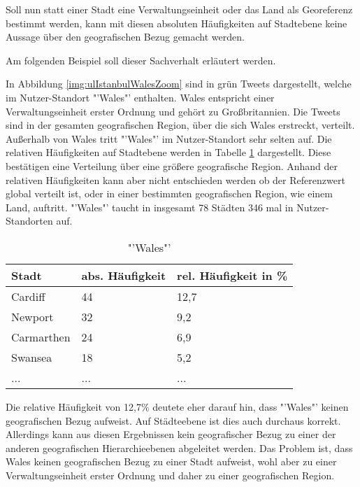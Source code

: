 			Soll nun statt einer Stadt eine Verwaltungseinheit oder das Land als Georeferenz bestimmt werden, kann mit diesen absoluten Häufigkeiten auf Stadtebene keine Aussage über den geografischen Bezug gemacht werden. 
			
			Am folgenden Beispiel soll dieser Sachverhalt erläutert werden.

			In Abbildung \ref{img:ulIstanbulWalesZoom} sind in grün Tweets dargestellt, welche im Nutzer-Standort "'Wales"' enthalten.
			Wales entspricht einer Verwaltungseinheit erster Ordnung und gehört zu Großbritannien.
			Die Tweets sind in der gesamten geografischen Region, über die sich Wales erstreckt, verteilt.
			Außerhalb von Wales tritt "'Wales"' im Nutzer-Standort sehr selten auf.
			Die relativen Häufigkeiten auf Stadtebene werden in Tabelle \ref{tab:walesCity} dargestellt.
			Diese bestätigen eine Verteilung über eine größere geografische Region.
			Anhand der relativen Häufigkeiten kann aber nicht entschieden werden ob der Referenzwert global verteilt ist, oder in einer bestimmten geografischen Region, wie einem Land, auftritt. 
			"'Wales"' taucht in insgesamt 78 Städten 346 mal in Nutzer-Standorten auf.

			\begin{table}[h]
			\centering
			\caption{"'Wales"'}
			\label{tab:walesCity}
			\begin{tabular}{|l|l|l|}
			\hline
			Stadt      & abs. Häufigkeit & rel. Häufigkeit in \% \\ \hline \hline
			Cardiff    & 44 			 & 12,7 \\ \hline
			Newport    & 32 			 & 9,2  \\ \hline
			Carmarthen & 24 			 & 6,9  \\ \hline
			Swansea    & 18 			 & 5,2  \\ \hline
			...    & ... & ...  \\ \hline
			\end{tabular}
			\end{table}

			Die relative Häufigkeit von 12,7\% deutete eher darauf hin, dass "'Wales"' keinen geografischen Bezug aufweist.
			Auf Städteebene ist dies auch durchaus korrekt. 
			Allerdings kann aus diesen Ergebnissen kein geografischer Bezug zu einer der anderen geografischen Hierarchieebenen abgeleitet werden.
			Das Problem ist, dass Wales keinen geografischen Bezug zu einer Stadt aufweist, wohl aber zu einer Verwaltungseinheit erster Ordnung und daher zu einer geografischen Region. 

